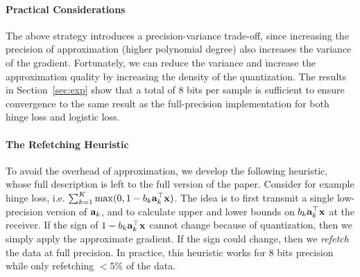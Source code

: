 \paragraph{Practical Considerations} The above strategy introduces a precision-variance trade-off, since increasing the precision of approximation (higher polynomial degree) also increases the variance of the gradient. 
Fortunately, we can reduce the variance and increase the approximation quality by increasing the density of the quantization. 
The results in Section~\ref{sec:exp} show that a total of $8$ bits per sample is sufficient to ensure convergence to the same result as the full-precision 
implementation for both hinge loss and logistic loss. 


\paragraph*{The Refetching Heuristic}
To avoid the overhead of approximation, we develop the following heuristic, whose full description is left to the full version of the paper. 
Consider for example hinge loss, i.e.  $\sum_{k=1}^K \max(0, 1 - b_k {\bf a}_k^\top {\bf x})$. 
The idea is to 
first transmit a single low-precision version of ${\bf a}_k$, and to  
calculate upper and lower bounds on $b_k {\bf a}_k^\top {\bf x}$ at the receiver.
If the sign of $1-b_k {\bf a}_k^\top {\bf x}$ cannot change because of quantization, then we simply apply the approximate gradient. 
If the sign could change, then we {\em refetch} the data at full precision.
In practice, this heuristic works for 
8 bits precision while only refetching $<5\%$
of the data.



